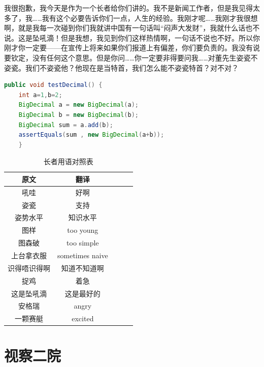 我很抱歉，我今天是作为一个长者给你们讲的。我不是新闻工作者，但是我见得太多了，我……我有这个必要告诉你们一点，人生的经验。我刚才呢……我刚才我很想啊，就是我每一次碰到你们我就讲中国有一句话叫“闷声大发财”，我就什么话也不说。这是坠吼滴！但是我想，我见到你们这样热情啊，一句话不说也不好。所以你刚才你一定要——在宣传上将来如果你们报道上有偏差，你们要负责的。我没有说要钦定，没有任何这个意思。但是你问……你一定要非得要问我……对董先生姿瓷不姿瓷。我们不姿瓷他？他现在是当特首，我们怎么能不姿瓷特首？对不对？

\begin{lstlisting}[language=Java,caption={一个典型的测试函数},label=testFunc:add]
public void testDecimal() {
	int a=1,b=2;
	BigDecimal a = new BigDecimal(a);
	BigDecimal b = new BigDecimal(b);
	BigDecimal sum = a.add(b);
	assertEquals(sum , new BigDecimal(a+b));
	}
\end{lstlisting}

\begin{table}[htbp]
	\caption{长者用语对照表}\label{table}
	\vspace{0.5em}\centering\wuhao
	\begin{tabular}{ccccc}
		\toprule[1.5pt]
		原文 & 翻译 \\
		\midrule[1pt]
		吼哇 & 好啊 \\
		姿瓷 & 支持 \\
		姿势水平 & 知识水平 \\
		图样 & too young \\
		图森破 & too simple \\
		上台拿衣服 & sometimes naive \\
		识得唔识得啊 & 知道不知道啊 \\
		捉鸡 & 着急 \\
		这是坠吼滴 & 这是最好的 \\
		安格瑞 & angry \\
		一颗赛艇 & excited \\
		\bottomrule[1.5pt]
	\end{tabular}
	\vspace{\baselineskip}
\end{table}



\chapter{视察二院}
